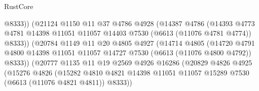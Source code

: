 \begin{lexlean}{RustCore}
\begin{coremodule}
                                  @8333))
                              (@21124
                                @1150
                                @11
                                @37
                                @4786
                                @4928
                                (@14387
                                  @4786
                                  (@14393
                                    @4773
                                    @4781
                                    @14398
                                    @11051
                                    @11057
                                    @14403
                                    @7530
                                    (@6613 (@11076 @4781 @4774))
                                    @8333))
                                (@20784
                                  @1149
                                  @11
                                  @20
                                  @4805
                                  @4927
                                  (@14714
                                    @4805
                                    (@14720
                                      @4791
                                      @4800
                                      @14398
                                      @11051
                                      @11057
                                      @14727
                                      @7530
                                      (@6613 (@11076 @4800 @4792))
                                      @8333))
                                  (@20777
                                    @1135
                                    @11
                                    @19
                                    @2569
                                    @4926
                                    @16286
                                    (@20829
                                      @4826
                                      @4925
                                      (@15276
                                        @4826
                                        (@15282
                                          @4810
                                          @4821
                                          @14398
                                          @11051
                                          @11057
                                          @15289
                                          @7530
                                          (@6613 (@11076 @4821 @4811))
                                          @8333))

\end{coremodule}
\end{lexlean}
